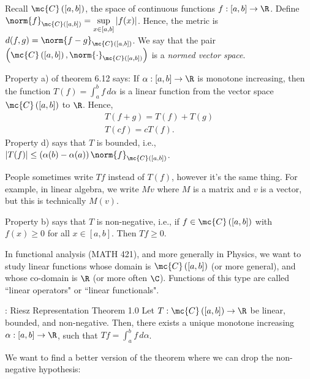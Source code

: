 Recall \(\mc{C}\left([a,b]\right)\), the space of continuous functions \(f:[a,b]\to\R\). Define \(\displaystyle\norm{f}_{\mc{C}\left([a,b]\right)}=\sup_{x\in[a,b]}|f(x)|\). Hence, the metric is \(d(f,g)=\norm{f-g}_{\mc{C}\left([a,b]\right)}\). We say that the pair \(\left(\mc{C}\left([a,b]\right),\norm{\cdot}_{\mc{C}\left([a,b]\right)}\right)\) is a \emph{normed vector space}.

\medskip

Property a) of theorem 6.12 says: If \(\alpha:[a,b]\to\R\) is monotone increasing, then the function \(T(f)=\displaystyle\int_a^b f \, d\alpha\) is a linear function from the vector space \(\mc{C}\left([a,b]\right)\) to \(\R\). Hence, 
\begin{gather*}
	T(f+g)=T(f)+T(g)\\
	T(cf)=cT(f).
\end{gather*}
Property d) says that \(T\) is bounded, i.e., \(|T(f)|\leq \left(\alpha(b)-\alpha(a)\right)\norm{f}_{\mc{C}\left([a,b]\right)}\).
\begin{notation}
	People sometimes write \(Tf\) instead of \(T(f)\), however it's the same thing. For example, in linear algebra, we write \(Mv\) where \(M\) is a matrix and \(v\) is a vector, but this is technically \(M(v)\).
\end{notation}
Property b) says that \(T\) is non-negative, i.e., if \(f\in\mc{C}\left([a,b]\right)\) with \(f(x)\geq 0\) for all \(x\in[a,b]\). Then \(Tf\geq 0\).

\medskip

In functional analysis (MATH 421), and more generally in Physics, we want to study linear functions whose domain is \(\mc{C}\left([a,b]\right)\) (or more general), and whose co-domain is \(\R\) (or more often \(\C\)). Functions of this type are called ``linear operators" or ``linear functionals".

\begin{ntheorem}{: Riesz Representation Theorem 1.0}
	Let \(T:\mc{C}\left([a,b]\right)\to\R\) be linear, bounded, and non-negative. Then, there exists a unique monotone increasing \(\alpha:[a,b]\to\R\), such that \(Tf=\displaystyle\int_a^b f \, d\alpha\).
\end{ntheorem}

We want to find a better version of the theorem where we can drop the non-negative hypothesis:


